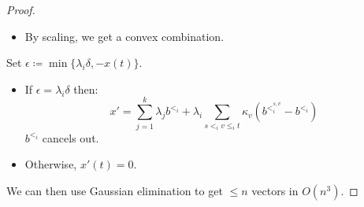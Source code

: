 \documentclass[11pt, a4paper]{article}
\newcommand{\set}[1]{\{#1\}}
\theoremstyle{remark}
\theoremstyle{definition}
\begin{document}
\begin{proof}
\begin{itemize}
		\item By scaling, we get a convex combination.
	\end{itemize}
	Set $\epsilon\coloneqq\min\set{\lambda_i\delta, -x(t)}$.
	\begin{itemize}
		\item
		If $\epsilon=\lambda_i\delta$ then:
		\[x'=\sum_{j=1}^k \lambda_jb^{<_i}+\lambda_i\sum_{s<_i v\leq_i t}\kappa_v(b^{<_i^{s,v}}-b^{<_i})\]
		$b^{<_i}$ cancels out.

		\item
		Otherwise, $x'(t)=0$.
	\end{itemize}
	We can then use Gaussian elimination to get $\leq n$ vectors in $O(n^3)$.
\end{proof}

\end{document}
